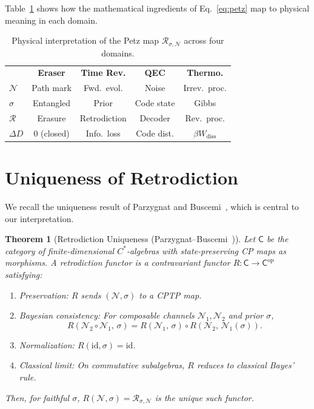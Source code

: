 \documentclass[prl,twocolumn,superscriptaddress,longbibliography,floatfix]{revtex4-2}
\newtheorem{theorem}{Theorem}
\newcommand{\id}{\mathrm{id}}
\newcommand{\Petz}{\mathcal{R}}
\newcommand{\chan}{\mathcal{N}}
\begin{document}
Table~\ref{tab:dictionary} shows how the mathematical ingredients of
Eq.~\eqref{eq:petz} map to physical meaning in each domain.

\begin{table}[htbp]
\caption{\label{tab:dictionary}Physical interpretation of the Petz map
$\Petz_{\sigma,\chan}$ across four domains.}
\begin{ruledtabular}
\begin{tabular}{lcccc}
& \textbf{Eraser} & \textbf{Time Rev.} & \textbf{QEC} & \textbf{Thermo.} \\
\colrule
$\chan$ & Path mark & Fwd.\ evol. & Noise & Irrev.\ proc. \\
$\sigma$ & Entangled & Prior & Code state & Gibbs \\
$\Petz$ & Erasure & Retrodiction & Decoder & Rev.\ proc. \\
$\Delta D$ & $0$ (closed) & Info.\ loss & Code dist. & $\beta W_{\text{diss}}$ \\
\end{tabular}
\end{ruledtabular}
\end{table}

\section{Uniqueness of Retrodiction}
\label{sec:retrodiction}

We recall the uniqueness result of Parzygnat and
Buscemi~\cite{Parzygnat2023}, which is central to our
interpretation.

\begin{theorem}[Retrodiction Uniqueness
  (Parzygnat--Buscemi~\cite{Parzygnat2023})]
\label{thm:unique}
Let $\mathsf{C}$ be the category of finite-dimensional $C^*$-algebras
with state-preserving CP maps as morphisms. A \emph{retrodiction functor}
is a contravariant functor $R: \mathsf{C} \to \mathsf{C}^{\mathrm{op}}$
satisfying:
\begin{enumerate}
\item[\emph{(i)}] \emph{Preservation:} $R$ sends $(\chan,\sigma)$ to a
  CPTP map.
\item[\emph{(ii)}] \emph{Bayesian consistency:} For composable channels
  $\chan_1, \chan_2$ and prior $\sigma$,
  \begin{equation}
  R(\chan_2 \circ \chan_1,\,\sigma)
    = R(\chan_1,\,\sigma) \circ R(\chan_2,\,\chan_1(\sigma)).
  \label{eq:functor}
  \end{equation}
\item[\emph{(iii)}] \emph{Normalization:} $R(\id,\sigma) = \id$.
\item[\emph{(iv)}] \emph{Classical limit:} On commutative subalgebras,
  $R$ reduces to classical Bayes' rule.
\end{enumerate}
Then, for faithful $\sigma$,
$R(\chan,\sigma) = \Petz_{\sigma,\chan}$ is the unique such functor.
\end{theorem}
\end{document}
